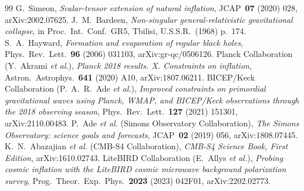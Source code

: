 \documentclass[11pt]{article}
\theoremstyle{definition}
\begin{document}
\begin{thebibliography}{99}
 G.~Simeon, \emph{Scalar-tensor extension of natural inflation}, JCAP~\textbf{07} (2020) 028, arXiv:2002.07625.
 J.~M.~Bardeen, \emph{Non-singular general-relativistic gravitational collapse}, in Proc.\ Int.\ Conf.\ GR5, Tbilisi, U.S.S.R.\ (1968) p.~174.
 S.~A.~Hayward, \emph{Formation and evaporation of regular black holes}, Phys.\ Rev.\ Lett.~\textbf{96} (2006) 031103, arXiv:gr-qc/0506126.
 Planck Collaboration (Y.~Akrami \emph{et al.}), \emph{Planck 2018 results. X. Constraints on inflation}, Astron.\ Astrophys.~\textbf{641} (2020) A10, arXiv:1807.06211.
 BICEP/Keck Collaboration (P.~A.~R.~Ade \emph{et al.}), \emph{Improved constraints on primordial gravitational waves using Planck, WMAP, and BICEP/Keck observations through the 2018 observing season}, Phys.\ Rev.\ Lett.~\textbf{127} (2021) 151301, arXiv:2110.00483.
 P.~Ade \emph{et al.} (Simons Observatory Collaboration), \emph{The Simons Observatory: science goals and forecasts}, JCAP~\textbf{02} (2019) 056, arXiv:1808.07445.
 K.~N.~Abazajian \emph{et al.} (CMB-S4 Collaboration), \emph{CMB-S4 Science Book, First Edition}, arXiv:1610.02743.
 LiteBIRD Collaboration (E.~Allys \emph{et al.}), \emph{Probing cosmic inflation with the LiteBIRD cosmic microwave background polarization survey}, Prog.\ Theor.\ Exp.\ Phys.~\textbf{2023} (2023) 042F01, arXiv:2202.02773.
\end{thebibliography}
\end{document}
